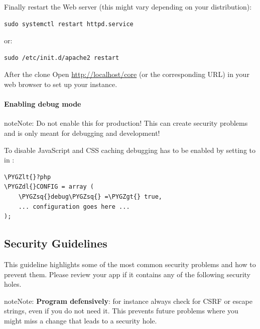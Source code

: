 \documentclass[letterpaper,10pt,english]{sphinxmanual}
\def\PYGZlt{\char`\<}
\def\PYGZgt{\char`\>}
\def\PYGZdl{\char`\$}
\def\PYGZsq{\char`\'}
\begin{document}
Finally restart the Web server (this might vary depending on your distribution):

\begin{Verbatim}[commandchars=\\\{\}]
sudo systemctl restart httpd.service
\end{Verbatim}

or:

\begin{Verbatim}[commandchars=\\\{\}]
sudo /etc/init.d/apache2 restart
\end{Verbatim}

After the clone Open \href{http://localhost/core}{http://localhost/core} (or the corresponding URL) in your web browser to set up your instance.


\paragraph{Enabling debug mode}
\label{general/devenv:enabling-debug-mode}\label{general/devenv:debugmode}
\begin{notice}{note}{Note:}
Do not enable this for production! This can create security problems and is only meant for debugging and development!
\end{notice}

To disable JavaScript and CSS caching debugging has to be enabled by setting  to  in :

\begin{Verbatim}[commandchars=\\\{\}]
\PYGZlt{}?php
\PYGZdl{}CONFIG = array (
    \PYGZsq{}debug\PYGZsq{} =\PYGZgt{} true,
    ... configuration goes here ...
);
\end{Verbatim}


\subsection{Security Guidelines}
\label{general/security::doc}\label{general/security:github-help-page}\label{general/security:security-guidelines}
This guideline highlights some of the most common security problems and how to prevent them. Please review your app if it contains any of the following security holes.

\begin{notice}{note}{Note:}
\textbf{Program defensively}: for instance always check for CSRF or escape strings, even if you do not need it. This prevents future problems where you might miss a change that leads to a security hole.
\end{notice}
\end{document}
